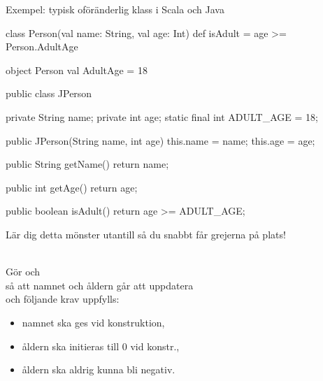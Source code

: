 \begin{Slide}{Exempel: typisk oföränderlig klass i Scala och Java}\SlideFontTiny
\vspace{-1em}
\begin{multicols}{2}
\begin{CodeSmall}[basicstyle=\ttfamily\SlideFontSize{5.7}{6.7}]
class Person(val name: String, val age: Int){
  def isAdult = age >= Person.AdultAge
}

object Person {
  val AdultAge = 18
}
\end{CodeSmall}

\columnbreak

\pause
\begin{CodeSmall}[language=Java,basicstyle=\ttfamily\SlideFontSize{5.7}{6.7}]
public class JPerson {
    private String name;
    private int age;
    static final int ADULT_AGE = 18;
      
    public JPerson(String name, int age){
      this.name = name;
      this.age = age;
    }

    public String getName(){
        return name;
    }

    public int getAge(){
        return age;
    }
    
    public boolean isAdult(){
        return age >= ADULT_AGE;
    }
}
\end{CodeSmall}
Lär dig detta mönster utantill så du snabbt får grejerna på plats!
\end{multicols}
\pause\vspace{-11em} \\Gör  och  \\så att namnet och åldern går att uppdatera\\och följande krav uppfylls:
\begin{itemize}
\item namnet ska ges vid konstruktion,
\item åldern ska initieras till 0 vid konstr.,
\item åldern ska aldrig kunna bli negativ.
\end{itemize}
\end{Slide}


